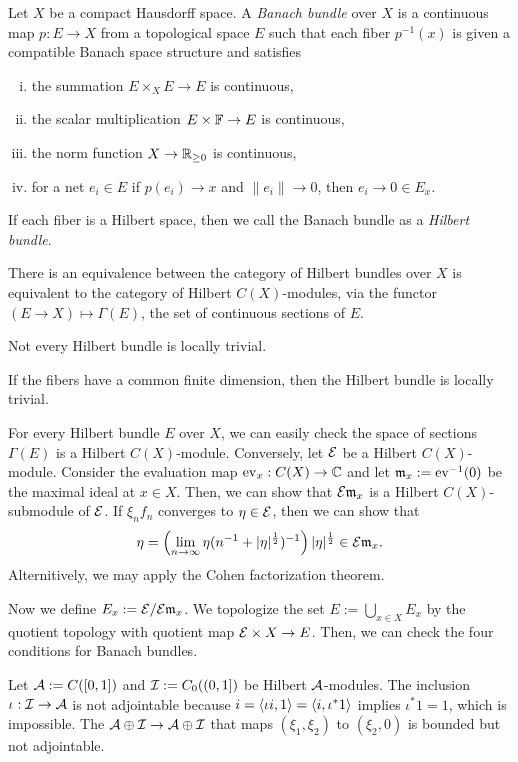 \documentclass{../../../small}
\begin{document}
\begin{ex}
Let $X$ be a compact Hausdorff space.
A \emph{Banach bundle} over $X$ is a continuous map $p:E\to X$ from a topological space $E$ such that each fiber $p^{-1}(x)$ is given a compatible Banach space structure and satisfies
\begin{enumerate}[(i)]
\item the summation $E\times_X E\to E$ is continuous,
\item the scalar multiplication $E\times\mathbb{F}\to E$ is continuous,
\item the norm function $X\to\mathbb{R}_{\ge0}$ is continuous,
\item for a net $e_i\in E$ if $p(e_i)\to x$ and $\|e_i\|\to0$, then $e_i\to 0\in E_x$.
\end{enumerate}
If each fiber is a Hilbert space, then we call the Banach bundle as a \emph{Hilbert bundle}.
\begin{parts}
\item There is an equivalence between the category of Hilbert bundles over $X$ is equivalent to the category of Hilbert $C(X)$-modules,
via the functor $(E\to X)\mapsto\Gamma(E)$, the set of continuous sections of $E$.
\item Not every Hilbert bundle is locally trivial.
\item If the fibers have a common finite dimension, then the Hilbert bundle is locally trivial.
\end{parts}
\end{ex}
\begin{pf}
For every Hilbert bundle $E$ over $X$, we can easily check the space of sections $\Gamma(E)$ is a Hilbert $C(X)$-module.
Conversely, let $\mathcal{E}$ be a Hilbert $C(X)$-module.
Consider the evaluation map $\operatorname{ev}_x:C(X)\to\mathbb{C}$ and let $\mathfrak{m}_x:=\operatorname{ev}^{-1}(0)$ be the maximal ideal at $x\in X$.
Then, we can show that $\mathcal{E}\mathfrak{m}_x$ is a Hilbert $C(X)$-submodule of $\mathcal{E}$.
If $\xi_nf_n$ converges to $\eta\in\mathcal{E}$, then we can show that
\[\eta=\left(\lim_{n\to\infty}\eta(n^{-1}+|\eta|^{\frac12})^{-1}\right)|\eta|^{\frac12}\in\mathcal{E}\mathfrak{m}_x.\]
Alternitively, we may apply the Cohen factorization theorem.

Now we define $E_x:=\mathcal{E}/\mathcal{E}\mathfrak{m}_x$.
We topologize the set $E:=\bigcup_{x\in X}E_x$ by the quotient topology with quotient map $\mathcal{E}\times X\to E$.
Then, we can check the four conditions for Banach bundles.
\end{pf}

\begin{ex}
Let $\mathcal{A}:=C([0,1])$ and $\mathcal{I}:=C_0((0,1])$ be Hilbert $\mathcal{A}$-modules.
The inclusion $\iota:\mathcal{I}\to\mathcal{A}$ is not adjointable because $i=\langle\iota i,1\rangle=\langle i,\iota^* 1\rangle$ implies $\iota^*1=1$, which is impossible.
The $\mathcal{A}\oplus\mathcal{I}\to\mathcal{A}\oplus\mathcal{I}$ that maps $(\xi_1,\xi_2)$ to $(\xi_2,0)$ is bounded but not adjointable.
\end{ex}
\end{document}

